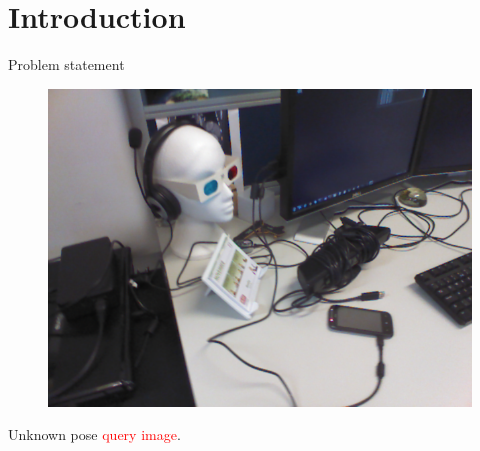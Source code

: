 \section{Introduction}

\label{sec:intro}

\begin{frame}{Problem statement}
	\begin{minipage}{0.47\linewidth}
		\centering
		\begin{figure}
			\includegraphics[width=0.55\linewidth]{images/intro/patchwork/nn_candidat}
		\end{figure}	
		Unknown pose \textcolor<2>{red}{query image}.
		
		\vfill
		

\end{minipage}
\end{frame}
